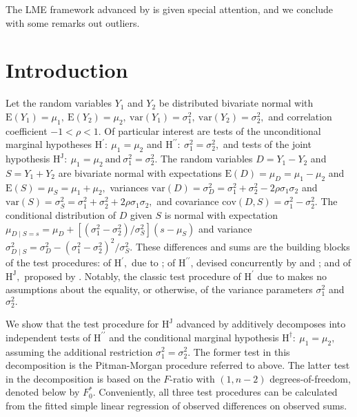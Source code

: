 \documentclass[12pt, a4paper]{report}
\theoremstyle{plain}
\theoremstyle{definition}
\theoremstyle{remark}
\begin{document}
The LME framework advanced by \citet{BXC2008} is given special attention, and we conclude with some remarks out outliers.





\newpage



\section{Introduction}  
Let the random variables $Y_1$ and $Y_2$ be distributed bivariate normal with $\mathrm{E}(Y_1)=\mu_1,\ \mathrm{E}(Y_2)=\mu_2,\ \mathrm{var}(Y_1)=\sigma^2_1,\ \mathrm{var}(Y_2)=\sigma^2_2,$ and correlation coefficient $-1<\rho<1.$ Of particular interest are tests of the unconditional marginal hypotheses $\textrm{H}^\prime\colon~\mu_1 = \mu_2$ and $\textrm{H}^{\prime\prime}\colon~\sigma^2_1 = \sigma^2_2,$ and tests of the joint hypothesis $\textrm{H}^\mathrm{J}\colon~\mu_1 = \mu_2\ \textrm{and}\ \sigma^2_1 = \sigma^2_2.$ The random variables $D=Y_1-Y_2$ and $S=Y_1+Y_2$ are bivariate normal with expectations $\mathrm{E}(D) = \mu_D = \mu_1- \mu_2$ and $\mathrm{E}(S) = \mu_S = \mu_1+ \mu_2,$ variances $\mathrm{var}(D) = \sigma^2_D = \sigma_1^2 + \sigma_2^2 - 2 \rho \sigma_1 \sigma_2$ and $\mathrm{var}(S) = \sigma^2_S = \sigma_1^2 + \sigma_2^2 + 2 \rho \sigma_1 \sigma_2,$ and covariance $\mathrm{cov}(D,S) = \sigma_1^2 - \sigma_2^2.$ The conditional distribution of $D$ given $S$ is normal with expectation $\mu_{D\mid S=s} = \mu_D + [ ( \sigma^2_1 - \sigma^2_2 ) / \sigma^2_S ] ( s - \mu_S )$ and variance $\sigma^2_{D\mid S} = \sigma^2_D - ( \sigma^2_1 - \sigma^2_2 )^2 / \sigma^2_S.$ These differences and sums are the building blocks of the test procedures: of $\textrm{H}^\prime,$ due to \cite{Student}; of $\textrm{H}^{\prime\prime}$, devised concurrently by \cite{Pit39} and \cite{Morgan39}; and of $\textrm{H}^\mathrm{J},$ proposed by \citet{BradBlack89}. Notably, the classic test procedure of $\textrm{H}^\prime$ due to \cite{Student} makes no assumptions about the equality, or otherwise, of the variance parameters $\sigma^2_1$ and $\sigma^2_2.$


We show that the test procedure for $\textrm{H}^\mathrm{J}$ advanced by \citet{BradBlack89} additively decomposes into independent tests of $\textrm{H}^{\prime\prime}$ and the conditional marginal hypothesis $\textrm{H}^\dag\colon~\mu_1 = \mu_2,$ assuming the additional restriction $\sigma^2_1 = \sigma^2_2.$  The former test in this decomposition is the Pitman-Morgan procedure referred to above. The latter test in the decomposition is based on the $F$-ratio with $(1,n-2)$ degrees-of-freedom, denoted below by $F_0^\ast.$ Conveniently, all three test procedures can be calculated from the fitted simple linear regression of observed differences on observed sums. 
\end{document}
